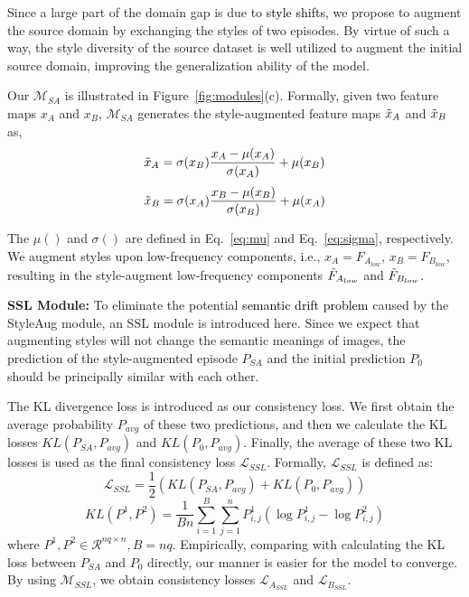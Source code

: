 \documentclass{article}
\newcommand{\fyq}{\textcolor{black}}
\begin{document}
Since a large part of the domain gap is due to \fyq{style shifts}, we propose to augment the source domain by exchanging the styles of two episodes. By virtue of such a way, the style diversity of the source dataset is well utilized to augment the initial source domain, improving the generalization ability of the model.

	
Our $\mathcal{M}_{SA}$ is illustrated in Figure~\ref{fig:modules}(c). Formally, given two feature maps $x_{A}$ and $x_{B}$, $\mathcal{M}_{SA}$ generates the style-augmented feature maps $\Tilde{x}_{A}$ and $\Tilde{x}_{B}$ as, 
	\begin{equation}
	 \Tilde{x}_{A} =\sigma(x_{B})\frac{x_{A}-\mu(x_{A})}{\sigma(x_{A})}+\mu(x_{B})\label{style-1}
	\end{equation}
	\begin{equation}
	 \Tilde{x}_{B} =\sigma(x_{A})\frac{x_{B}-\mu(x_{B})}{\sigma(x_{B})}+\mu(x_{A})
	\end{equation}
	
The $\mu()$ and $\sigma()$ are defined in Eq.~\ref{eq:mu} and Eq.~\ref{eq:sigma}, respectively. We augment styles upon  low-frequency components, i.e., $x_{A} = F_{A_{low}}$, $x_{B} = F_{B_{low}}$, resulting in the style-augment low-frequency components $\Tilde{F}_{A_{low}}$ and $\Tilde{F}_{B_{low}}$.
	


\noindent \textbf{SSL Module:} 
To eliminate the potential \fyq{semantic drift problem} caused by the StyleAug module, 
an SSL module is introduced here. Since we expect that augmenting styles will not change the semantic meanings of images, the prediction of the style-augmented episode $P_{SA}$ and the initial prediction $P_{0}$ should be principally similar with each other.



The KL divergence loss is introduced as our consistency loss. We first obtain the average probability $P_{avg}$ of these two predictions, and then we calculate the KL losses $KL(P_{SA}, P_{avg})$ and $KL(P_{0}, P_{avg})$. Finally, the average of these two KL losses is used as the final consistency loss $\mathcal{L}_{SSL}$. Formally, $\mathcal{L}_{SSL}$ is defined as:
\begin{equation}
	\mathcal{L}_{SSL}=\frac{1}{2}(KL(P_{SA},P_{avg}) + KL(P_{0},P_{avg}))
	\end{equation}
	\begin{equation}
	KL(P^1,P^2)=\frac{1}{Bn}\sum_{i=1}^{B}\sum_{j=1}^{n}P^{1}_{i,j}(\log P^{1}_{i,j}-\log P^{2}_{i,j})
	\end{equation}
	where $P^1, P^2\in\mathcal{R}^{nq\times n}, B=nq$. Empirically, comparing with calculating the KL loss between $P_{SA}$ and ${P_{0}}$ directly, our manner is easier for the model to converge.
	By using $\mathcal{M}_{SSL}$, we obtain consistency losses $\mathcal{L}_{A_{SSL}}$ and $\mathcal{L}_{B_{SSL}}$. 
\end{document}
